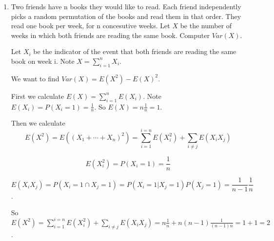 \documentclass[11pt,preview]{standalone} %
\begin{document}
\begin{enumerate}
\begin{enumerate}
\item Compute $Var(X)$.
\begin{Freeform}{0.5}
\Solution $Var(X) = E(X^2) - E(X)^2$. We've calculated $E(X)^2$ in the last part and need $E(X^2)$.

$$E(X^2) = E((X_1 + \cdots + X_n)^2) = \sum_{i=1}^{i=n}E(X_i^2) + \sum_{i \neq j} E(X_iX_j)$$

$$E(X_i^2) = P(X_i = 1) = \frac{1}{2n}$$

$$E(X_iX_j) = P(X_i = 1 \cap X_j = 1) = P(X_i = 1 | X_j = 1) P(X_j = 1) = \frac{1}{2(n-1)} \frac{1}{2n}$$.

So $E(X^2) = \sum_{i=1}^{i=n}E(X_i^2) + \sum_{i \neq j} E(X_iX_j) = n \frac{1}{2n} + n(n-1) \frac{1}{2(n-1)} \frac{1}{2n} = \frac{1}{2} + \frac{1}{4} = \frac{3}{4}$.

Hence, $Var(X) = E(X^2) - E(X)^2 = \frac{3}{4} - \frac{1}{2^2} = \frac{1}{2}$.

\end{Freeform}

\end{enumerate}

\item Two friends have n books they would like to read. Each friend independently picks a random permutation of the books and read them in that order. They read one book per week, for n concesutive weeks. Let $X$ be the number of weeks in which both friends are reading the same book. Computer $Var(X)$.

\begin{Freeform}{1}
\Solution Let $X_i$ be the indicator of the event that both friends are reading the same book on week i. Note $X = \sum_{i=1}^{n} X_i$. 

We  want to find $Var(X) = E(X^2) - E(X)^2$. 

First we calculate $E(X) = \sum_{i=1}^nE(X_i)$. Note $E(X_i) = P(X_i = 1) = \frac{1}{n}$. So $E(X) = n \frac{1}{n} = 1$. 

Then we calculate $$E(X^2) = E((X_1 + \cdots + X_n)^2) = \sum_{i=1}^{i=n}E(X_i^2) + \sum_{i \neq j} E(X_iX_j)$$

$$E(X_i^2) = P(X_i = 1) = \frac{1}{n}$$

$$E(X_iX_j) = P(X_i = 1 \cap X_j = 1) = P(X_i = 1 | X_j = 1) P(X_j = 1) = \frac{1}{n-1} \frac{1}{n}$$.

So $E(X^2) = \sum_{i=1}^{i=n}E(X_i^2) + \sum_{i \neq j} E(X_iX_j) = n \frac{1}{n} + n(n-1) \frac{1}{(n-1)n} = 1 + 1 = 2$.



\end{Freeform}
\end{enumerate}
\end{document}
